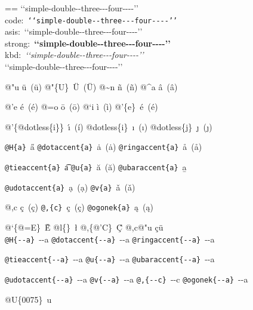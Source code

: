 \documentclass{book}
\makeatletter
\newcommand\Texinfocommandstyletextkbd[1]{{\ttfamily\textsl{#1}}}%
\newenvironment{Texinfopreformatted}{%
  \par\GNUTobeylines\obeyspaces\frenchspacing\parskip=\z@\parindent=\z@}{}
{\catcode`\^^M=13 \gdef\GNUTobeylines{\catcode`\^^M=13 \def^^M{\null\par}}}
\newenvironment{Texinfoindented}{\begin{list}{}{}\item\relax}{\end{list}}
\renewcommand{\_}{\Texinfounderscore\discretionary{}{}{}}
\makeatother
\begin{document}
{{\begin{Texinfoindented}
\begin{Texinfopreformatted}
{`}{`}simple-double{-}{-}three{-}{-}{-}four{-}{-}{-}-{'}{'}\leavevmode{}\\
code:\ \texttt{{`}{`}simple-double{-}{-}three{-}{-}{-}four{-}{-}{-}-{'}{'}}\ \leavevmode{}\\
asis:\ {`}{`}simple-double{-}{-}three{-}{-}{-}four{-}{-}{-}-{'}{'}\ \leavevmode{}\\
strong:\ \textbf{{`}{`}simple-double{-}{-}three{-}{-}{-}four{-}{-}{-}-{'}{'}}\ \leavevmode{}\\
kbd:\ \Texinfocommandstyletextkbd{{`}{`}simple-double{-}{-}three{-}{-}{-}four{-}{-}{-}-{'}{'}}\ \leavevmode{}\\

`\hbox{}`simple-double-\hbox{}-three{-}{-}{-}four{-}{-}{-}-'\hbox{}'\leavevmode{}\\

%
%
%
%

@"u \"{u}\ (ü)
@"\{U\}\ \"{U}\ (Ü) 
@\~{}n \~{n}\ (ñ)
@\^{}a \^{a}\ (â)

@'e \'{e}\ (é)
@=o \={o}\ (ō)
@`i \`{i}\ (ì)
@'\{e\}\ \'{e}\ (é)

@'\{@dotless\{i\}\}\ \'{\i{}}\ (í)
@dotless\{i\}\ \i{}\ (ı)
@dotless\{j\}\ \j{}\ (ȷ)

\texttt{@H\{a\}}\ \H{a}
\texttt{@dotaccent\{a\}}\ \.{a}\ (ȧ)
\texttt{@ringaccent\{a\}}\ \r{a}\ (å)

\texttt{@tieaccent\{a\}}\ \t{a}
\texttt{@u\{a\}}\ \u{a}\ (ă)
\texttt{@ubaraccent\{a\}}\ \b{a}

\texttt{@udotaccent\{a\}}\ \d{a}\ (ạ)
\texttt{@v\{a\}}\ \v{a}\ (ǎ)

@,c \c{c}\ (ç)
\texttt{@,\{c\}}\ \c{c}\ (ç)
\texttt{@ogonek\{a\}}\ \k{a}\ (ą)

@`\{@=E\}\ \`{\={E}}
@l\{\}\ \l{}
@,\{@'C\}\ \c{\'{C}}
@,c@"u \c{c}\"{u}\ \leavevmode{}\\

\texttt{@H\{{-}{-}a\}}\ \H{{-}{-}a}
\texttt{@dotaccent\{{-}{-}a\}}\ \.{{-}{-}a}
\texttt{@ringaccent\{{-}{-}a\}}\ \r{{-}{-}a}

\texttt{@tieaccent\{{-}{-}a\}}\ \t{{-}{-}a}
\texttt{@u\{{-}{-}a\}}\ \u{{-}{-}a}
\texttt{@ubaraccent\{{-}{-}a\}}\ \b{{-}{-}a}

\texttt{@udotaccent\{{-}{-}a\}}\ \d{{-}{-}a}
\texttt{@v\{{-}{-}a\}}\ \v{{-}{-}a}
\texttt{@,\{{-}{-}c\}}\ \c{{-}{-}c}
\texttt{@ogonek\{{-}{-}a\}}\ \k{{-}{-}a}

@U\{0075\}\ u


\end{Texinfopreformatted}
\end{Texinfoindented}}}
\end{document}
